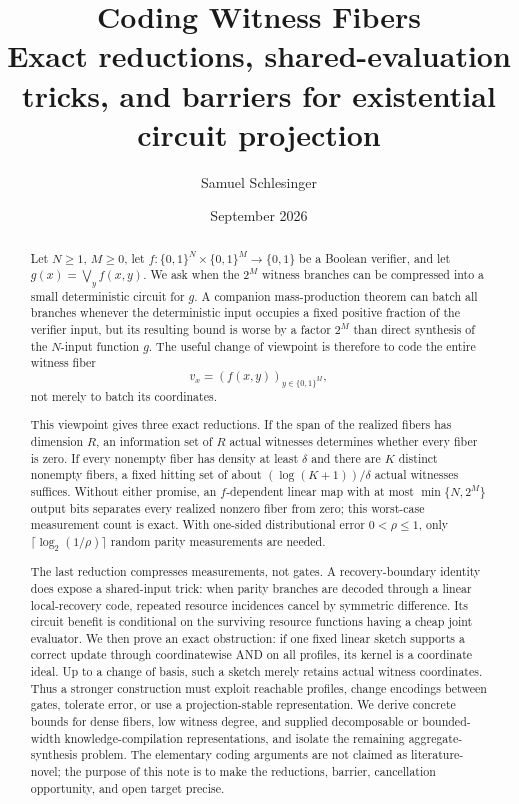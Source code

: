 \documentclass[11pt]{article}
\title{\textbf{Coding Witness Fibers}\\[0.35em]
\large Exact reductions, shared-evaluation tricks, and barriers for
existential circuit projection}
\author{}
\date{}
\author{Samuel Schlesinger}
\date{September 2026}
\theoremstyle{definition}
\theoremstyle{remark}
\newcommand{\bits}{\{0,1\}}
\begin{document}
\maketitle

\begin{abstract}
Let $N\ge1$, $M\ge0$, let $f:\bits^N\times\bits^M\to\bits$ be a Boolean
verifier, and let
$g(x)=\bigvee_y f(x,y)$.  We ask when the $2^M$ witness branches can be
compressed into a small deterministic circuit for $g$.  A companion
mass-production theorem can batch all branches whenever the deterministic
input occupies a fixed positive fraction of the verifier input, but its
resulting bound is worse by a factor $2^M$ than direct synthesis of the
$N$-input function $g$.  The useful change of viewpoint is therefore to code
the entire witness fiber
\[
  v_x=(f(x,y))_{y\in\bits^M},
\]
not merely to batch its coordinates.

This viewpoint gives three exact reductions.  If the span of the realized
fibers has dimension $R$, an information set of $R$ actual witnesses
determines whether every fiber is zero.  If every nonempty fiber has density
at least $\delta$ and there are $K$ distinct nonempty fibers, a fixed hitting
set of about $(\log(K+1))/\delta$ actual witnesses suffices.  Without either
promise, an $f$-dependent linear map with at most $\min\{N,2^M\}$ output bits
separates every realized nonzero fiber from zero; this worst-case measurement
count is exact.  With one-sided distributional error $0<\rho\le1$, only
$\lceil\log_2(1/\rho)\rceil$ random parity measurements are needed.

The last reduction compresses measurements, not gates.  A recovery-boundary
identity does expose a shared-input trick: when parity branches are decoded
through a linear local-recovery code, repeated resource incidences cancel by
symmetric difference.  Its circuit benefit is conditional on the surviving
resource functions having a cheap joint evaluator.  We then prove an exact
obstruction: if one fixed linear sketch supports a correct update through
coordinatewise AND on all profiles, its kernel is a coordinate ideal.  Up to
a change of basis, such a sketch merely retains actual witness coordinates.
Thus a stronger construction must exploit reachable profiles, change
encodings between gates, tolerate error, or use a projection-stable
representation.  We derive concrete bounds for dense fibers, low witness
degree, and supplied decomposable or bounded-width knowledge-compilation
representations, and isolate the remaining aggregate-synthesis problem.  The
elementary coding arguments are not claimed as literature-novel; the purpose
of this note is to make the reductions, barrier, cancellation opportunity,
and open target precise.
\end{abstract}
\end{document}
